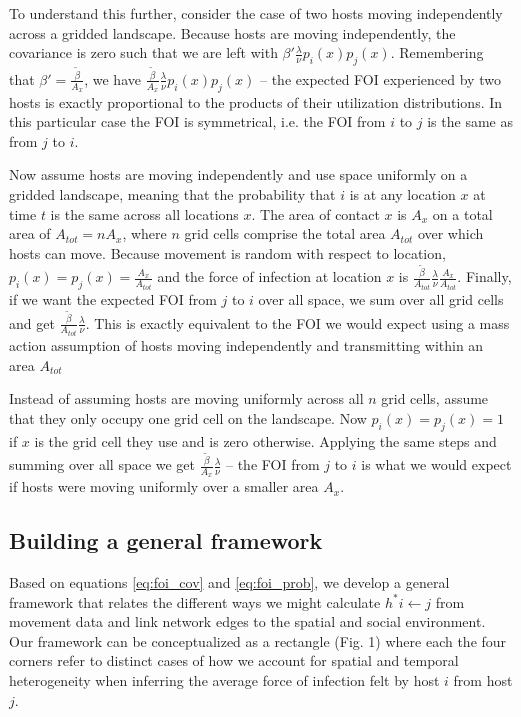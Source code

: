 \documentclass[letterpaper]{article}
\begin{document}
To understand this further, consider the case of two hosts moving independently across a gridded landscape.  Because hosts are moving independently, the covariance is zero such that we are left with $\beta' \frac{\lambda}{\nu} p_i(x)p_j(x)$.  Remembering that $\beta' = \frac{\tilde{\beta}}{A_x}$, we have $\frac{\tilde{\beta}}{A_x} \frac{\lambda}{\nu} p_i(x)p_j(x)$ -- the expected FOI experienced by two hosts is exactly proportional to the products of their utilization distributions. In this particular case the FOI is symmetrical, i.e. the FOI from $i$ to $j$ is the same as from $j$ to $i$.

Now assume hosts are moving independently and use space uniformly on a gridded landscape, meaning that the probability that $i$ is at any location $x$ at time $t$ is the same across all locations $x$. The area of contact $x$ is $A_x$ on a total area of $A_{tot} = n A_x$, where $n$ grid cells comprise the total area $A_{tot}$ over which hosts can move. Because movement is random with respect to location, $p_i(x) = p_j(x) = \frac{A_x}{A_{tot}}$ and the force of infection at location $x$ is $\frac{\tilde{\beta}}{A_{tot}} \frac{\lambda}{\nu} \frac{A_x}{A_{tot}}$.  Finally, if we want the expected FOI from $j$ to $i$ over all space, we sum over all grid cells and get $\frac{\tilde{\beta}}{A_{tot}} \frac{\lambda}{\nu}$. This is exactly equivalent to the FOI we would expect using a mass action assumption of hosts moving independently and transmitting within an area $A_{tot}$ \citep{McCallum2001}

Instead of assuming hosts are moving uniformly across all $n$ grid cells, assume that they only occupy one grid cell on the landscape.  Now $p_i(x) = p_j(x) = 1$ if $x$ is the grid cell they use and is zero otherwise.  Applying the same steps and summing over all space we get $\frac{\tilde{\beta}}{A_{x}} \frac{\lambda}{\nu}$ -- the FOI from $j$ to $i$ is what we would expect if hosts were moving uniformly over a smaller area $A_x$. 

\subsection*{Building a general framework}

Based on equations \ref{eq:foi_cov} and \ref{eq:foi_prob}, we develop a general framework that relates the different ways we might calculate $h^*{i \leftarrow j}$ from movement data and link network edges to the spatial and social environment. Our framework can be conceptualized as a rectangle (Fig. 1) where each the four corners refer to distinct cases of how we account for spatial and temporal heterogeneity when inferring the average force of infection felt by host $i$ from host $j$.  
\end{document}
